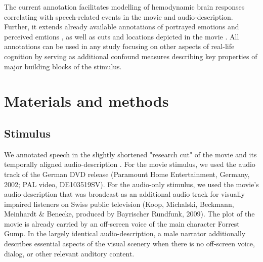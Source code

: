 \documentclass[10pt,a4paper,twocolumn]{article}
\begin{document}
The current annotation facilitates modelling of hemodynamic brain responses
correlating with speech-related events in the movie and audio-description.
Further, it extends already available annotations of portrayed emotions
\citep{labs2015portrayed} and perceived emtions
\citep{lettieri2019emotionotopy}, as well as cuts and locations depicted in the movie \citep{haeusler2016annotation}. All annotations can be used in any study focusing on other aspects of real-life cognition by serving as additional
confound measures describing key properties of major building blocks of the stimulus.

\section*{Materials and methods}
\subsection*{Stimulus}
We annotated speech in the slightly shortened "research cut" of the movie
\citep{hanke2016simultaneous} and its temporally aligned audio-description
\citep{hanke2014audiomovie}. For the movie stimulus, we used the audio track of
the German DVD release (Paramount Home Entertainment, Germany, 2002; PAL video,
DE103519SV)\citep{ForrestGumpDVD}. For the audio-only stimulus, we used the
movie's audio-description that was broadcast as an additional audio track for
visually impaired listeners on Swiss public television (Koop, Michalski,
Beckmann, Meinhardt \& Benecke, produced by Bayrischer Rundfunk,
2009)\citep{ForrestGumpGermanAD}. The plot of the movie is already carried by an
off-screen voice of the main character Forrest Gump. In the largely identical audio-description, a male narrator additionally describes essential aspects of the visual scenery when there is no off-screen voice, dialog, or other relevant auditory content.
\end{document}
